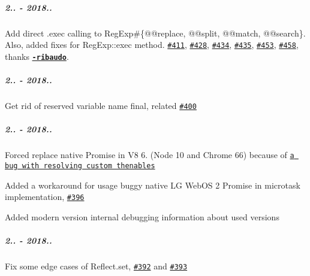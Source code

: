 \subparagraph*{2.. -\/ 2018..}


\begin{DoxyItemize}
\item Add direct .exec calling to {\ttfamily Reg\+Exp\#\{@@replace, @@split, @@match, @@search\}}. Also, added fixes for {\ttfamily Reg\+Exp\+::exec} method. \href{https://github.com/zloirock/core-js/issues/411}{\tt \#411}, \href{https://github.com/zloirock/core-js/issues/428}{\tt \#428}, \href{https://github.com/zloirock/core-js/issues/434}{\tt \#434}, \href{https://github.com/zloirock/core-js/issues/435}{\tt \#435}, \href{https://github.com/zloirock/core-js/issues/453}{\tt \#453}, \href{https://github.com/zloirock/core-js/issues/458}{\tt \#458}, thanks \href{https://github.com/nicolo-ribaudo}{\tt {\bfseries -\/ribaudo}}.
\end{DoxyItemize}

\subparagraph*{2.. -\/ 2018..}


\begin{DoxyItemize}
\item Get rid of reserved variable name {\ttfamily final}, related \href{https://github.com/zloirock/core-js/issues/400}{\tt \#400}
\end{DoxyItemize}

\subparagraph*{2.. -\/ 2018..}


\begin{DoxyItemize}
\item Forced replace native {\ttfamily Promise} in V8 6. (Node 10 and Chrome 66) because of \href{https://bugs.chromium.org/p/chromium/issues/detail?id=830565}{\tt a bug with resolving custom thenables}
\item Added a workaround for usage buggy native LG Web\+OS 2 {\ttfamily Promise} in microtask implementation, \href{https://github.com/zloirock/core-js/issues/396}{\tt \#396}
\item Added modern version internal debugging information about used versions
\end{DoxyItemize}

\subparagraph*{2.. -\/ 2018..}


\begin{DoxyItemize}
\item Fix some edge cases of {\ttfamily Reflect.\+set}, \href{https://github.com/zloirock/core-js/issues/392}{\tt \#392} and \href{https://github.com/zloirock/core-js/issues/393}{\tt \#393}
\end{DoxyItemize}

